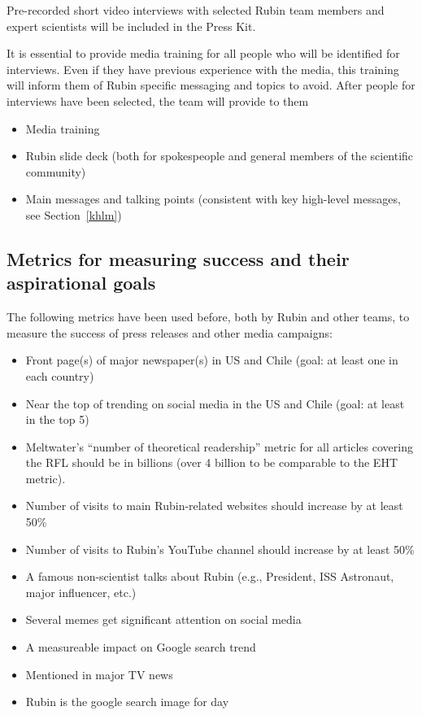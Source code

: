 Pre-recorded short video interviews with selected Rubin team members and expert scientists will be included
in the Press Kit.

It is essential to provide media training for all people who will be identified for interviews. Even if they have
previous experience with the media, this training will inform them of Rubin specific messaging and topics to avoid.
After people for interviews have been selected, the team will provide to them
\begin{itemize}
\item Media training
\item Rubin slide deck (both for spokespeople and general members of the scientific community)
\item Main messages and talking points (consistent with key high-level messages, see Section~\ref{khlm})
\end{itemize} 





\subsection{Metrics for measuring success and their aspirational goals}

The following metrics have been used before, both by Rubin and other teams, to measure
the success of press releases and other media campaigns:
\begin{itemize}
\item Front page(s) of major newspaper(s) in US and Chile (goal: at least one in each country)
\item Near the top of trending on social media in the US and Chile (goal: at least in the top 5)
\item Meltwater’s ``number of theoretical readership'' metric for all articles covering the RFL
               should be in billions (over 4 billion to be comparable to the EHT metric).
\item Number of visits to main Rubin-related websites should increase by at least 50\%
\item Number of visits to Rubin's YouTube channel should increase by at least 50\%
\item A famous non-scientist talks about Rubin (e.g., President, ISS Astronaut, major influencer, etc.)
\item Several memes get significant attention on social media
\item A measureable impact on Google search trend
\item Mentioned in major TV news
\item Rubin is the google search image for day
\end{itemize}

